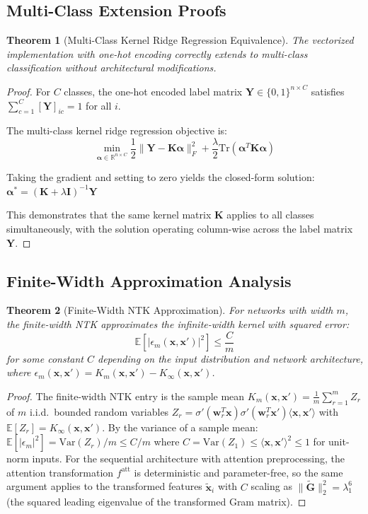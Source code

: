 \documentclass{article}
\theoremstyle{plain}
\newtheorem{theorem}{Theorem}[section]
\theoremstyle{definition}
\theoremstyle{remark}
\newcommand{\R}{\mathbb{R}}
\newcommand{\E}{\mathbb{E}}
\begin{document}
\subsection{Multi-Class Extension Proofs}

\begin{theorem}[Multi-Class Kernel Ridge Regression Equivalence]
The vectorized implementation with one-hot encoding correctly extends to multi-class classification without architectural modifications.
\end{theorem}

\begin{proof}
For $C$ classes, the one-hot encoded label matrix $\mathbf{Y} \in \{0,1\}^{n \times C}$ satisfies $\sum_{c=1}^C [\mathbf{Y}]_{ic} = 1$ for all $i$.

The multi-class kernel ridge regression objective is:
$$\min_{\boldsymbol{\alpha} \in \R^{n \times C}} \frac{1}{2} \|\mathbf{Y} - \mathbf{K} \boldsymbol{\alpha}\|_F^2 + \frac{\lambda}{2} \text{Tr}(\boldsymbol{\alpha}^T \mathbf{K} \boldsymbol{\alpha})$$

Taking the gradient and setting to zero yields the closed-form solution:
$\boldsymbol{\alpha}^* = (\mathbf{K} + \lambda \mathbf{I})^{-1} \mathbf{Y}$

This demonstrates that the same kernel matrix $\mathbf{K}$ applies to all classes simultaneously, with the solution operating column-wise across the label matrix $\mathbf{Y}$.
\end{proof}

\subsection{Finite-Width Approximation Analysis}

\begin{theorem}[Finite-Width NTK Approximation]
For networks with width $m$, the finite-width NTK approximates the infinite-width kernel with squared error:
$$\E[|\epsilon_m(\mathbf{x}, \mathbf{x}')|^2] \leq \frac{C}{m}$$
for some constant $C$ depending on the input distribution and network architecture, where $\epsilon_m(\mathbf{x}, \mathbf{x}') = K_m(\mathbf{x}, \mathbf{x}') - K_\infty(\mathbf{x}, \mathbf{x}')$.
\end{theorem}

\begin{proof}
The finite-width NTK entry is the sample mean $K_m(\mathbf{x}, \mathbf{x}') = \frac{1}{m}\sum_{r=1}^m Z_r$ of $m$ i.i.d.\ bounded random variables $Z_r = \sigma'(\mathbf{w}_r^T \mathbf{x})\sigma'(\mathbf{w}_r^T \mathbf{x}')\langle \mathbf{x}, \mathbf{x}'\rangle$ with $\E[Z_r] = K_\infty(\mathbf{x}, \mathbf{x}')$. By the variance of a sample mean: $\E[|\epsilon_m|^2] = \mathrm{Var}(Z_r)/m \leq C/m$ where $C = \mathrm{Var}(Z_1) \leq \langle\mathbf{x},\mathbf{x}'\rangle^2 \leq 1$ for unit-norm inputs. For the sequential architecture with attention preprocessing, the attention transformation $f^{\text{att}}$ is deterministic and parameter-free, so the same argument applies to the transformed features $\tilde{\mathbf{x}}_i$ with $C$ scaling as $\|\tilde{\mathbf{G}}\|_2^2 = \lambda_1^6$ (the squared leading eigenvalue of the transformed Gram matrix).
\end{proof}
\end{document}
